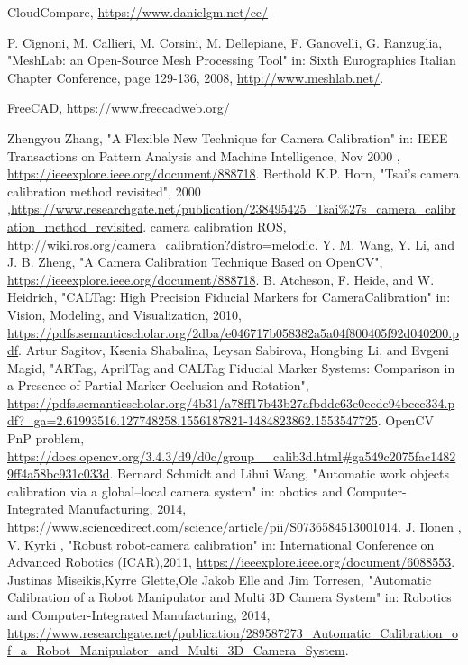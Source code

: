 \begin{thebibliography}{1}
		CloudCompare,
		\url{https://www.danielgm.net/cc/}

		P. Cignoni, M. Callieri, M. Corsini, M. Dellepiane, F. Ganovelli, G. Ranzuglia,
		"MeshLab: an Open-Source Mesh Processing Tool" in: Sixth Eurographics Italian Chapter Conference, page 129-136, 2008, \url{http://www.meshlab.net/}.

		FreeCAD,
		\url{https://www.freecadweb.org/}


		Zhengyou Zhang,
		"A Flexible New Technique for Camera Calibration" in: IEEE Transactions on Pattern Analysis and Machine Intelligence, Nov 2000 , \url{https://ieeexplore.ieee.org/document/888718}.
		Berthold K.P. Horn,
		"Tsai’s camera calibration method revisited", 2000 ,\url{https://www.researchgate.net/publication/238495425_Tsai%27s_camera_calibration_method_revisited}.
		camera calibration ROS, 
		\url{http://wiki.ros.org/camera_calibration?distro=melodic}.
		Y. M. Wang,  Y. Li, and J. B. Zheng,
		"A Camera Calibration Technique Based on OpenCV", \url{https://ieeexplore.ieee.org/document/888718}.
		B. Atcheson, F. Heide, and W. Heidrich,
		"CALTag: High Precision Fiducial Markers for CameraCalibration" in: Vision, Modeling, and Visualization, 2010, \url{https://pdfs.semanticscholar.org/2dba/e046717b058382a5a04f800405f92d040200.pdf}.
		Artur Sagitov, Ksenia Shabalina, Leysan Sabirova, Hongbing Li, and Evgeni Magid,
		"ARTag, AprilTag and CALTag Fiducial Marker Systems: Comparison in a Presence of Partial Marker Occlusion and Rotation", \url{https://pdfs.semanticscholar.org/4b31/a78ff17b43b27afbddc63e0eede94bcec334.pdf?_ga=2.61993516.127748258.1556187821-1484823862.1553547725}.
		OpenCV PnP problem, \url{https://docs.opencv.org/3.4.3/d9/d0c/group__calib3d.html#ga549c2075fac14829ff4a58bc931c033d}.
		Bernard Schmidt and Lihui Wang,
		"Automatic work objects calibration via a global–local camera system" in: obotics and Computer-Integrated Manufacturing, 2014, \url{https://www.sciencedirect.com/science/article/pii/S0736584513001014}.
		 J. Ilonen , V. Kyrki ,
		"Robust robot-camera calibration" in: International Conference on Advanced Robotics (ICAR),2011, \url{https://ieeexplore.ieee.org/document/6088553}.
		Justinas Miseikis,Kyrre Glette,Ole Jakob Elle and Jim Torresen,
		"Automatic Calibration of a Robot Manipulator and Multi 3D Camera System" in: Robotics and Computer-Integrated Manufacturing, 2014, \url{https://www.researchgate.net/publication/289587273_Automatic_Calibration_of_a_Robot_Manipulator_and_Multi_3D_Camera_System}.




\end{thebibliography}

